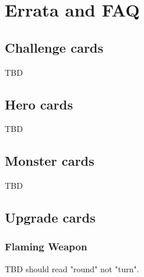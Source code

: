 \section{Errata and FAQ}
\label{sec:ErrataAndFAQ}

\subsection{Challenge cards}
TBD

\subsection{Hero cards}
TBD

\subsection{Monster cards}
TBD

\subsection{Upgrade cards}

\subsubsection{Flaming Weapon}
TBD should read "round" not "turn".